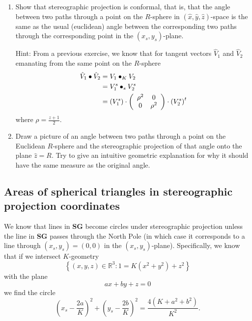 \documentclass{ximera}
\begin{document}
\begin{exercise}\hfil
\begin{enumerate}
\item Show that stereographic projection is conformal, that is, that
  the angle between two paths through a point on the $R$-sphere in
  $\left( \hat{x},\hat{y},\hat{z}\right)$-space is the same as the
  usual (euclidean) angle between the corresponding two paths through
  the corresponding point in the $\left( x_{s},y_{s}\right) $-plane.

Hint: From a previous exercise, we know that for tangent vectors
$\hat{V}_{1}$ and $\hat{V}_{2}$ emanating from the same point on the
$R$-sphere
\begin{align*}
\hat{V}_{1}\bullet\hat{V}_{2}  &  =V_{1}\bullet_{K}V_{2}\\
&  =V_{1}^{s}\bullet_{s}V_{2}^{s}\\
&  =\left(  V_{1}^{s}\right)  \cdot\left(
\begin{array}
[c]{cc}%
\rho^{2} & 0\\
0 & \rho^{2}%
\end{array}
\right)  \cdot\left(  V_{2}^{s}\right)  ^{t}
\end{align*}
where $\rho =\frac{z+1}{2}$. 



\item Draw a picture of an angle between two paths through a point on
  the Euclidean $R$-sphere and the stereographic projection of that
  angle onto the plane $\hat{z}=R$. Try to give an intuitive geometric
  explanation for why it should have the same measure as the original
  angle.
\end{enumerate}
\end{exercise}

\subsection*{Areas of spherical triangles in stereographic projection
coordinates}

We know that lines in \textbf{SG} become circles under stereographic
projection unless the line in \textbf{SG} passes through the North
Pole (in which case it corresponds to a line through $\left(
x_{s},y_{s}\right) =\left( 0,0\right) $ in the $\left(
x_{s},y_{s}\right) $-plane). Specifically, we know that if we intersect 
$K$-geometry
\[
\left\{  \left(  x,y,z\right)  \in\mathbb{R}^{3}:1=K\left(  x^{2}%
+y^{2}\right)  +z^{2}\right\}
\]
with the plane
\[
ax+by+z = 0
\]
we find the circle
\[
\left(  x_{s}-\frac{2a}{K}\right)  ^{2}+\left(  y_{s}-\frac{2b}{K}\right)
^{2}=\frac{4\left(  K+a^{2}+b^{2}\right)  }{K^{2}}.
\]
\end{document}
